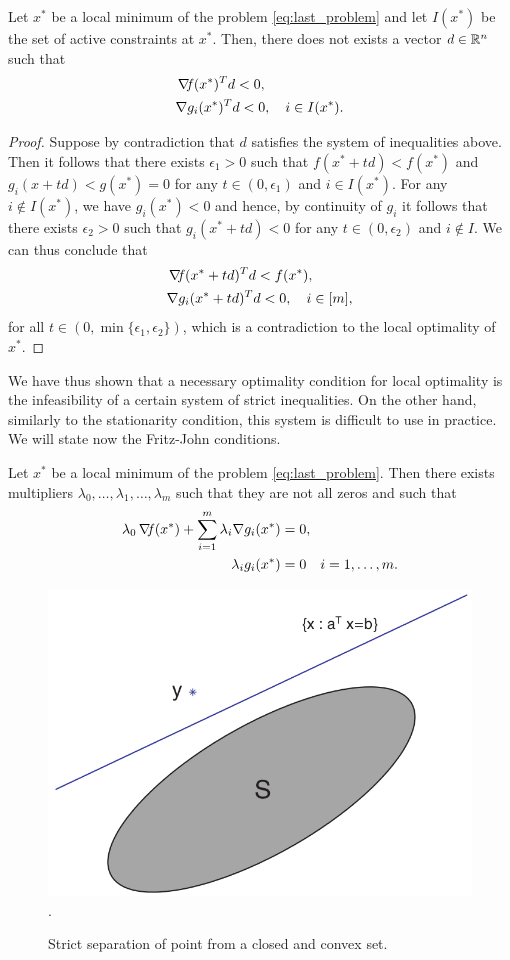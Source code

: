 \documentclass[10pt,a4paper]{article}
\begin{document}
\begin{lemma}
Let $x^*$ be a local minimum of the problem \eqref{eq:last_problem} and let $I(x^*)$ be the set of active constraints at $x^*$. Then, there does not exists a vector $d\in\mathbb{R}^n$ such that 
\begin{align*}
&\operatorname*{\mathit{\nabla \!f}}(x^*)^Td<0,\\
&\nabla g_i (x^*)^Td<0,\quad i \in I(x^*).
\end{align*}
\end{lemma}
\begin{proof}
Suppose by contradiction that $d$ satisfies the system of inequalities above. Then it follows that there exists $\epsilon_1>0$ such that $f(x^*+td)<f(x^*)$ and $g_i(x+td)<g(x^*)=0$ for any $t\in (0,\epsilon_1)$ and $i\in I(x^*)$. For any $i\not \in I(x^*)$, we have $g_i(x^*)<0$ and hence, by continuity of $g_i$ it follows that there exists $\epsilon_2>0$ such that $g_i(x^*+td)<0$ for any $t\in (0,\epsilon_2)$ and $i\not \in I$. We can thus conclude that 
\begin{align*}
&\operatorname*{\mathit{\nabla \!f}}(x^*+td)^Td<f(x^*),\\
&\nabla g_i (x^*+td)^Td<0,\quad i \in [m],
\end{align*}
for all $t\in (0,\min\{\epsilon_1,\epsilon_2\})$, which is a contradiction to the local optimality of $x^*$.
\end{proof}
We have thus shown that a necessary optimality condition for local optimality is the infeasibility of a certain system of strict inequalities. On the other hand, similarly to the stationarity condition, this system is difficult to use in practice. We will state now the Fritz-John conditions.
\begin{theorem}
Let $x^*$ be a local minimum of the problem \eqref{eq:last_problem}. Then there exists multipliers $\lambda_0,\dots, \lambda_1, \dots, \lambda_m$ such that they are not all zeros and such that 
\begin{equation}\label{eq:fritzjohn}
\begin{split}
\lambda_0\operatorname*{\mathit{\nabla \!f}}(x^*)+ \sum_{i=1}^{m} \lambda_i \nabla g_i(x^*) &= 0,\\
\lambda_ig_i(x^*)&=0 \quad i=1, \dots, m.
\end{split}
\end{equation}
\end{theorem}
\begin{figure}
	\centering
	\includegraphics[width=0.5\linewidth]{separation}.
	\caption{Strict separation of point from a closed and convex set.} \label{fig:separtation}
\end{figure}
\end{document}
